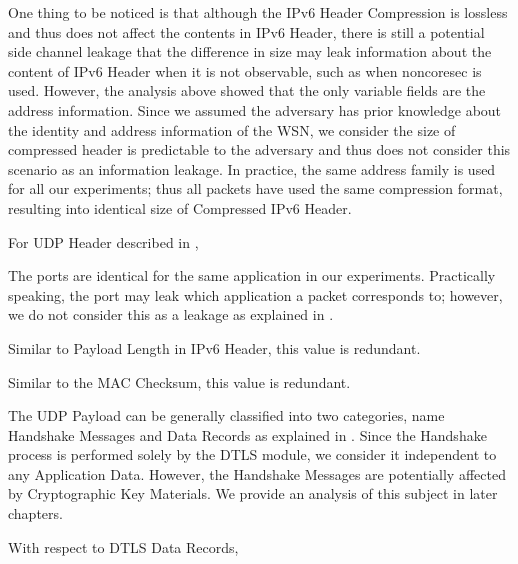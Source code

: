 One thing to be noticed is that although the IPv6 Header Compression is lossless and thus does not affect the contents in IPv6 Header, there is still a potential side channel leakage that the difference in size may leak information about the content of IPv6 Header when it is not observable, such as when noncoresec is used. However, the analysis above showed that the only variable fields are the address information. Since we assumed the adversary has prior knowledge about the identity and address information of the WSN, we consider the size of compressed header is predictable to the adversary and thus does not consider this scenario as an information leakage. In practice, the same address family is used for all our experiments; thus all packets have used the same compression format, resulting into identical size of Compressed IPv6 Header.

For UDP Header described in ,

\begin{description}[style=nextline]
	\item[Source and Destination Port]
	The ports are identical for the same application in our experiments. Practically speaking, the port may leak which application a packet corresponds to; however, we do not consider this as a leakage as explained in .
	\item[Payload Length]
	Similar to Payload Length in IPv6 Header, this value is redundant.
	\item[Checksum]
	Similar to the MAC Checksum, this value is redundant.
\end{description}

The UDP Payload can be generally classified into two categories, name Handshake Messages and Data Records as explained in  . Since the Handshake process is performed solely by the DTLS module, we consider it independent to any Application Data. However,  the Handshake Messages are potentially affected by Cryptographic Key Materials. We provide an analysis of this subject in later chapters.

With respect to DTLS Data Records,

